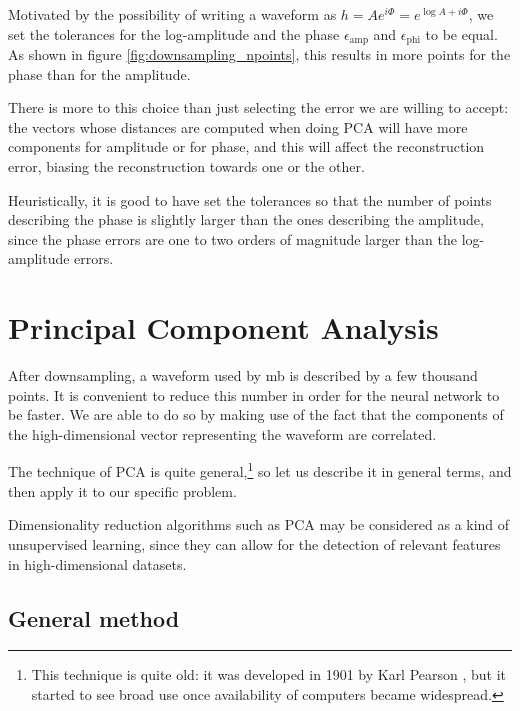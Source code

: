 \documentclass[main.tex]{subfiles}
\begin{document}
Motivated by the possibility of writing a waveform as \(h = A e^{i \Phi } = e^{\log A + i \Phi }\), we set the tolerances for the log-amplitude and the phase \(\epsilon _{\text{amp}}\) and \(\epsilon _{\text{phi}}\) to be equal.
As shown in figure \ref{fig:downsampling_npoints}, this results in more points for the phase than for the amplitude. 

There is more to this choice than just selecting the error we are willing to accept:
the vectors whose distances are computed when doing \ac{PCA} will have more components for amplitude or for phase, and this will affect the reconstruction error, biasing the reconstruction towards one or the other. 

Heuristically, it is good to have set the tolerances so that the number of points describing the phase is slightly larger than the ones describing the amplitude, since the phase errors are one to two orders of magnitude larger than the log-amplitude errors. 

\section{Principal Component Analysis} \label{sec:principal-component-analysis}

After downsampling, a waveform used by \acs{mb} is described by a few thousand points.
It is convenient to reduce this number in order for the neural network to be faster.
We are able to do so by making use of the fact that the components of the high-dimensional vector representing the waveform are correlated.

The technique of \ac{PCA} is quite general,\footnote{This technique is quite old: it was developed in 1901 by Karl Pearson \cite[]{pearsonLIIILinesPlanes1901,manlyMultivariateStatisticalMethods2017}, but it started to see broad use once availability of computers became widespread.} so let us describe it in general terms, and then apply it to our specific problem.

Dimensionality reduction algorithms such as \ac{PCA} may be considered as a kind of unsupervised learning, since they can allow for the detection of relevant features in high-dimensional datasets.

\subsection{General method}
\end{document}
